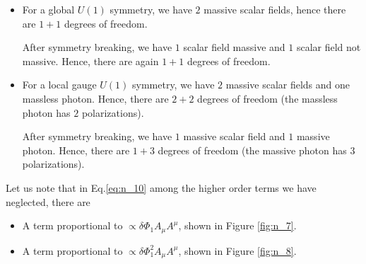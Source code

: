 \documentclass[../main/main.tex]{subfiles}
\begin{document}
\begin{itemize}
\item For a global \( U(1) \)  symmetry, we have \( 2 \) massive scalar fields, hence there are \( 1+1 \) degrees of freedom.

After symmetry breaking, we have \( 1 \)  scalar field massive and \( 1 \) scalar field not massive. Hence, there are again \( 1+1 \) degrees of freedom.

\item For a local gauge \( U(1) \) symmetry, we have \( 2 \) massive scalar fields and one massless photon. Hence, there are \( 2 + 2 \) degrees of freedom (the massless photon has \( 2 \) polarizations).

After symmetry breaking, we have \( 1 \) massive scalar field  and \( 1 \) massive photon. Hence, there are  \( 1+3 \) degrees of freedom (the massive photon has \( 3 \) polarizations).

\end{itemize}



\begin{remark}
  Let us note that in Eq.\eqref{eq:n_10} among the higher order terms we have neglected, there are
\begin{itemize}
\item A term proportional to \( \propto \delta \Phi _1 A_ \mu A ^ \mu  \), shown in Figure \ref{fig:n_7}.
\item A term proportional to \( \propto \delta \Phi _1 ^2 A _ \mu A ^ \mu  \), shown in Figure \ref{fig:n_8}.
\end{itemize}
\end{remark}
\end{document}
